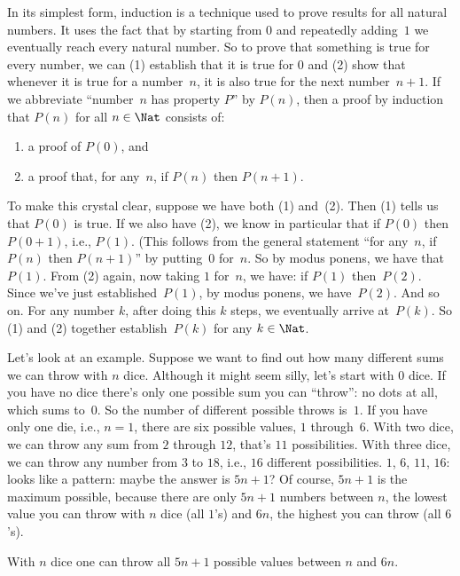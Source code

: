 \documentclass[../../../include/open-logic-section]{subfiles}
\begin{document}


In its simplest form, induction is a technique used to prove results
for all natural numbers. It uses the fact that by starting from $0$
and repeatedly adding~$1$ we eventually reach every natural number.  So
to prove that something is true for every number, we can (1) establish
that it is true for $0$ and (2) show that whenever it is true for a number~$n$,
it is also true for the next number~$n+1$.  If we abbreviate ``number~$n$ has
property $P$'' by $P(n)$, then a proof by induction that $P(n)$ for
all $n \in \Nat$ consists of:
\begin{enumerate}
\item a proof of $P(0)$, and
\item a proof that, for any~$n$, if $P(n)$ then $P(n+1)$.
\end{enumerate}
To make this crystal clear, suppose we have both (1) and~(2).  Then
(1) tells us that $P(0)$ is true.  If we also have (2), we know in
particular that if $P(0)$ then $P(0+1)$, i.e., $P(1)$. (This follows
from the general statement ``for any~$n$, if $P(n)$ then $P(n+1)$'' by
putting~$0$ for~$n$.  So by modus ponens, we have that~$P(1)$.  From
(2) again, now taking $1$ for~$n$, we have: if $P(1)$ then~$P(2)$.
Since we've just established~$P(1)$, by modus ponens, we
have~$P(2)$. And so on.  For any number $k$, after doing this $k$
steps, we eventually arrive at~$P(k)$.  So (1) and (2) together
establish~$P(k)$ for any $k \in \Nat$.

Let's look at an example.  Suppose we want to find out how many
different sums we can throw with $n$ dice.  Although it might seem
silly, let's start with $0$ dice.  If you have no dice there's only one
possible sum you can ``throw'': no dots at all, which sums to~$0$. So
the number of different possible throws is~$1$. If you have only one
die, i.e., $n=1$, there are six possible values, $1$ through~$6$. With
two dice, we can throw any sum from $2$ through $12$, that's $11$
possibilities.  With three dice, we can throw any number from $3$ to
$18$, i.e., $16$ different possibilities.  $1$, $6$, $11$, $16$: looks
like a pattern: maybe the answer is $5n+1$?  Of course, $5n+1$ is the
maximum possible, because there are only $5n+1$ numbers between $n$,
the lowest value you can throw with $n$ dice (all $1$'s) and $6n$, the
highest you can throw (all $6$'s).

\begin{thm}
  With $n$ dice one can throw all $5n+1$ possible values between $n$
  and $6n$.
\end{thm}
\end{document}
